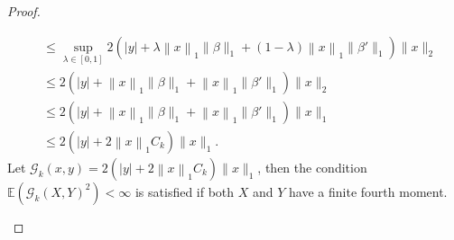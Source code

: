 \documentclass[12pt]{article}
\theoremstyle{remark}
\theoremstyle{plain}
\begin{document}
\begin{proof}
\begin{enumerate}
\begin{align*}
        &\leq \sup_{\lambda \in \left[0,1\right]} 2 \left(|y| + \lambda \left\lVert x\right\rVert_1 \lVert\beta\rVert_1 + (1 - \lambda) \left\lVert x\right\rVert_1 \lVert\beta'\rVert_1\right)\lVert x\rVert_2\\
        & \leq 2 \left(|y| + \left\lVert x\right\rVert_1 \lVert\beta\rVert_1 + \left\lVert x\right\rVert_1 \lVert\beta'\rVert_1\right)\lVert x\rVert_2\\
        & \leq 2 \left(|y| + \left\lVert x\right\rVert_1 \lVert\beta\rVert_1 + \left\lVert x\right\rVert_1 \lVert\beta'\rVert_1\right)\lVert x\rVert_1\\
        &\leq 2 \left(|y| + 2\left\lVert x\right\rVert_1 C_k\right)\lVert x\rVert_1.
    \end{align*}
    Let $\mathcal{G}_k(x, y) = 2 \left(|y| + 2\left\lVert x\right\rVert_1 C_k\right)\lVert x\rVert_1$, then the condition $\mathbb{E}\left(\mathcal{G}_k(X, Y)^2\right) < \infty$ is satisfied if both $X$ and $Y$ have a finite fourth moment.
\end{enumerate}
\end{proof}
\end{document}
